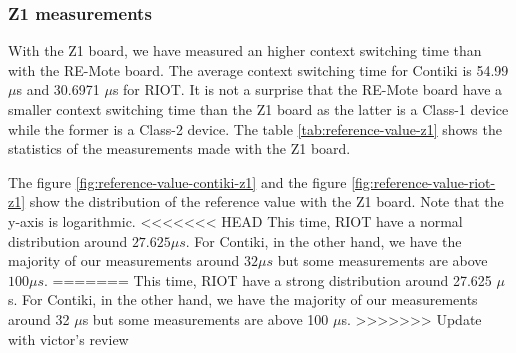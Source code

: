 \subsubsection{Z1 measurements}
With the Z1 board, we have measured an higher context switching time than with the RE-Mote board. The average context switching time for Contiki is 54.99 $\mu$s and 30.6971 $\mu$s for RIOT.
It is not a surprise that the RE-Mote board have a smaller context switching time than the Z1 board as the latter is a Class-1 device while the former is a Class-2 device.
The table \ref{tab:reference-value-z1} shows the statistics of the measurements made with the Z1 board.



The figure \ref{fig:reference-value-contiki-z1} and the figure \ref{fig:reference-value-riot-z1} show the distribution of the reference value with the Z1 board.
Note that the y-axis is logarithmic.
<<<<<<< HEAD
This time, RIOT have a normal distribution around $27.625\mu s$.
For Contiki, in the other hand, we have the majority of our measurements around $32\mu s$ but some measurements are above $100 \mu s$.
=======
This time, RIOT have a strong distribution around 27.625 $\mu$s.
For Contiki, in the other hand, we have the majority of our measurements around 32 $\mu$s but some measurements are above 100 $\mu$s.
>>>>>>> Update with victor's review

